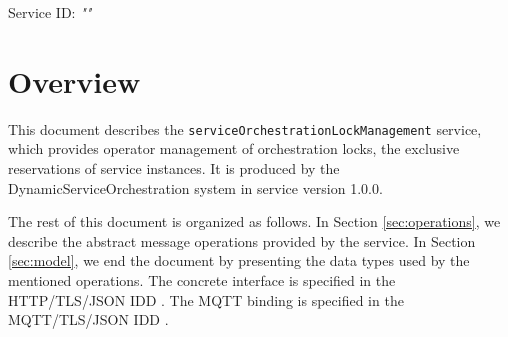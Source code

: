 \documentclass[a4paper]{arrowhead}
\begin{document}
\sloppy

\ArrowheadSetup

\begin{center}
  \vspace*{1cm}
  \huge{\arrowtitle}

  \vspace*{0.2cm}
  \LARGE{\arrowtype}
  \vspace*{1cm}

  \Large{Service ID: \textit{"\arrowid"}}

  \vspace*{\fill}


  \vspace*{1cm}
  \vspace*{\fill}

  \begin{abstract}
    This document describes the \texttt{service\allowbreak{}Orchestration\allowbreak{}Lock\allowbreak{}Management} service, version 1.0.0, produced by the DynamicServiceOrchestration core system of Arrowhead 5.2.2.
  \end{abstract}

  \vspace*{1cm}
\end{center}

\newpage

\tableofcontents
\newpage

\section{Overview}
\label{sec:overview}

This document describes the \texttt{service\allowbreak{}Orchestration\allowbreak{}Lock\allowbreak{}Management} service, which provides operator management of orchestration locks, the exclusive reservations of service instances.
It is produced by the DynamicServiceOrchestration system \cite{dso-sysd} in service version 1.0.0.

The rest of this document is organized as follows.
In Section \ref{sec:operations}, we describe the abstract message operations provided by the service.
In Section \ref{sec:model}, we end the document by presenting the data types used by the mentioned operations.
The concrete interface is specified in the HTTP/TLS/JSON IDD \cite{dso-serviceOrchestrationLockManagement-http-idd}. The MQTT binding is specified in the MQTT/TLS/JSON IDD \cite{dso-serviceOrchestrationLockManagement-mqtt-idd}.
\end{document}
